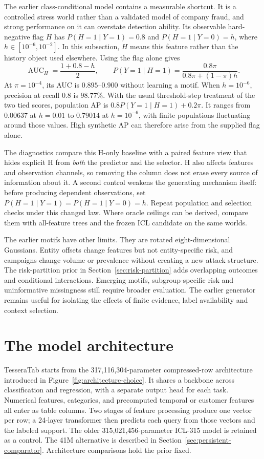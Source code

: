 \documentclass[11pt]{article}
\begin{document}
The earlier class-conditional model contains a measurable shortcut. It is a controlled stress world rather than a validated model of company fraud, and strong performance on it can overstate detection ability. Its observable hard-negative flag $H$ has $P(H=1\mid Y=1)=0.8$ and $P(H=1\mid Y=0)=h$, where $h\in[10^{-6},10^{-2}]$. In this subsection, $H$ means this feature rather than the history object used elsewhere. Using the flag alone gives
\[
\operatorname{AUC}_H=\frac{1+0.8-h}{2},\qquad
P(Y=1\mid H=1)=\frac{0.8\pi}{0.8\pi+(1-\pi)h}.
\]
At $\pi=10^{-4}$, its AUC is $0.895$--$0.900$ without learning a motif. When $h=10^{-6}$, precision at recall $0.8$ is $98.77\%$. With the usual threshold-step treatment of the two tied scores, population AP is $0.8P(Y=1\mid H=1)+0.2\pi$. It ranges from $0.00637$ at $h=0.01$ to $0.79014$ at $h=10^{-6}$, with finite populations fluctuating around those values. High synthetic AP can therefore arise from the supplied flag alone.

The diagnostics compare this H-only baseline with a paired feature view that hides explicit H from \emph{both} the predictor and the selector. H also affects features and observation channels, so removing the column does not erase every source of information about it. A second control weakens the generating mechanism itself: before producing dependent observations, set $P(H=1\mid Y=1)=P(H=1\mid Y=0)=h$. Repeat population and selection checks under this changed law. Where oracle ceilings can be derived, compare them with all-feature trees and the frozen ICL candidate on the same worlds.

The earlier motifs have other limits. They are rotated eight-dimensional Gaussians. Entity offsets change features but not entity-specific risk, and campaigns change volume or prevalence without creating a new attack structure. The risk-partition prior in Section~\ref{sec:risk-partition} adds overlapping outcomes and conditional interactions. Emerging motifs, subgroup-specific risk and uninformative missingness still require broader evaluation. The earlier generator remains useful for isolating the effects of finite evidence, label availability and context selection.


\section{The model architecture}
\label{sec:icl-blueprint}

TesseraTab starts from the 317,116,304-parameter compressed-row architecture introduced in Figure~\ref{fig:architecture-choice}. It shares a backbone across classification and regression, with a separate output head for each task. Numerical features, categories, and precomputed temporal or customer features all enter as table columns. Two stages of feature processing produce one vector per row; a 24-layer transformer then predicts each query from those vectors and the labeled support. The older 315,021,456-parameter ICL-315 model is retained as a control. The 41M alternative is described in Section~\ref{sec:persistent-comparator}. Architecture comparisons hold the prior fixed.
\end{document}
